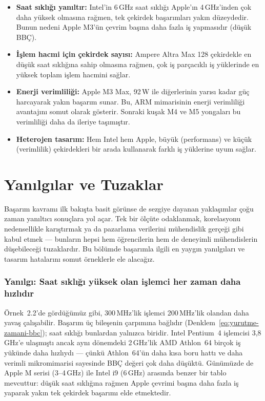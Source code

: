 \begin{itemize}
    \item \textbf{Saat sıklığı yanıltır:} Intel'in 6\,GHz saat sıklığı Apple'ın 4\,GHz'inden çok daha yüksek olmasına rağmen, tek çekirdek başarımları yakın düzeydedir. Bunun nedeni Apple M3'ün çevrim başına daha fazla iş yapmasıdır (düşük BBÇ).

    \item \textbf{İşlem hacmi için çekirdek sayısı:} Ampere Altra Max 128 çekirdekle en düşük saat sıklığına sahip olmasına rağmen, çok iş parçacıklı iş yüklerinde en yüksek toplam işlem hacmini sağlar.

    \item \textbf{Enerji verimliliği:} Apple M3 Max, 92\,W ile diğerlerinin yarısı kadar güç harcayarak yakın başarım sunar. Bu, ARM mimarisinin enerji verimliliği avantajını somut olarak gösterir. Sonraki kuşak M4 ve M5 yongaları bu verimliliği daha da ileriye taşımıştır.

    \item \textbf{Heterojen tasarım:} Hem Intel hem Apple, büyük (performans) ve küçük (verimlilik) çekirdekleri bir arada kullanarak farklı iş yüklerine uyum sağlar.
\end{itemize}


\section{Yanılgılar ve Tuzaklar}
\label{sec:yanilgilar-tuzaklar}

Başarım kavramı ilk bakışta basit görünse de sezgiye dayanan yaklaşımlar çoğu zaman yanıltıcı sonuçlara yol açar. Tek bir ölçüte odaklanmak, korelasyonu nedensellikle karıştırmak ya da pazarlama verilerini mühendislik gerçeği gibi kabul etmek --- bunların hepsi hem öğrencilerin hem de deneyimli mühendislerin düşebileceği tuzaklardır. Bu bölümde başarımla ilgili en yaygın yanılgıları ve tasarım hatalarını somut örneklerle ele alacağız.

\subsubsection*{Yanılgı: Saat sıklığı yüksek olan işlemci her zaman daha hızlıdır}
Örnek~2.2'de gördüğümüz gibi, 300\,MHz'lik işlemci 200\,MHz'lik olandan daha yavaş çalışabilir. Başarım üç bileşenin çarpımına bağlıdır (Denklem~\ref{eq:yurutme-zamani-bbc}); saat sıklığı bunlardan yalnızca biridir. Intel Pentium~4 işlemcisi 3,8\,GHz'e ulaşmıştı ancak aynı dönemdeki 2\,GHz'lik AMD Athlon~64 birçok iş yükünde daha hızlıydı --- çünkü Athlon~64'ün daha kısa boru hattı ve daha verimli mikromimarisi sayesinde BBÇ değeri çok daha düşüktü. Günümüzde de Apple M serisi (3--4\,GHz) ile Intel i9 (6\,GHz) arasında benzer bir tablo mevcuttur: düşük saat sıklığına rağmen Apple çevrimi başına daha fazla iş yaparak yakın tek çekirdek başarımı elde etmektedir.

